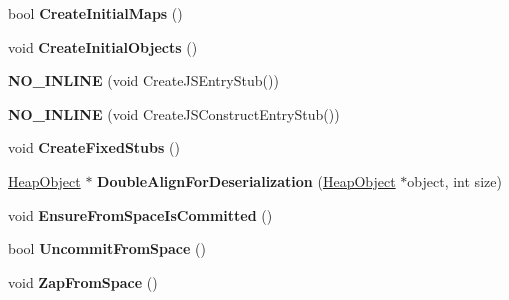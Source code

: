 \begin{DoxyCompactItemize}
\item 
bool {\bfseries Create\+Initial\+Maps} ()\hypertarget{classv8_1_1internal_1_1_heap_ad7fe169d010fb15fd30faf73ab25bec9}{}\label{classv8_1_1internal_1_1_heap_ad7fe169d010fb15fd30faf73ab25bec9}

\item 
void {\bfseries Create\+Initial\+Objects} ()\hypertarget{classv8_1_1internal_1_1_heap_a55333ecac271f96a017ee7b61afd4ada}{}\label{classv8_1_1internal_1_1_heap_a55333ecac271f96a017ee7b61afd4ada}

\item 
{\bfseries N\+O\+\_\+\+I\+N\+L\+I\+NE} (void Create\+J\+S\+Entry\+Stub())\hypertarget{classv8_1_1internal_1_1_heap_a6fe9ba6843a1b5f22d0c3ab18fec1969}{}\label{classv8_1_1internal_1_1_heap_a6fe9ba6843a1b5f22d0c3ab18fec1969}

\item 
{\bfseries N\+O\+\_\+\+I\+N\+L\+I\+NE} (void Create\+J\+S\+Construct\+Entry\+Stub())\hypertarget{classv8_1_1internal_1_1_heap_aa4ee33d2b7a103a3b758769d2d82023d}{}\label{classv8_1_1internal_1_1_heap_aa4ee33d2b7a103a3b758769d2d82023d}

\item 
void {\bfseries Create\+Fixed\+Stubs} ()\hypertarget{classv8_1_1internal_1_1_heap_a15bb609624aa2a85f4a2738e58b18822}{}\label{classv8_1_1internal_1_1_heap_a15bb609624aa2a85f4a2738e58b18822}

\item 
\hyperlink{classv8_1_1internal_1_1_heap_object}{Heap\+Object} $\ast$ {\bfseries Double\+Align\+For\+Deserialization} (\hyperlink{classv8_1_1internal_1_1_heap_object}{Heap\+Object} $\ast$object, int size)\hypertarget{classv8_1_1internal_1_1_heap_aa3a4170385c9f2b38e3457d067945192}{}\label{classv8_1_1internal_1_1_heap_aa3a4170385c9f2b38e3457d067945192}

\item 
void {\bfseries Ensure\+From\+Space\+Is\+Committed} ()\hypertarget{classv8_1_1internal_1_1_heap_ad0f0a8f9ba63986f40283c598729b41f}{}\label{classv8_1_1internal_1_1_heap_ad0f0a8f9ba63986f40283c598729b41f}

\item 
bool {\bfseries Uncommit\+From\+Space} ()\hypertarget{classv8_1_1internal_1_1_heap_a04d450829451fa2312ec04e38bc04b5b}{}\label{classv8_1_1internal_1_1_heap_a04d450829451fa2312ec04e38bc04b5b}

\item 
void {\bfseries Zap\+From\+Space} ()\hypertarget{classv8_1_1internal_1_1_heap_a16b1bbd65e1ebff79a440fcfda282080}{}\label{classv8_1_1internal_1_1_heap_a16b1bbd65e1ebff79a440fcfda282080}


\end{DoxyCompactItemize}
